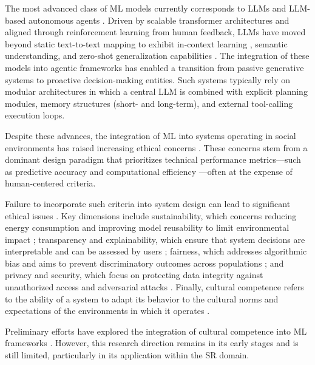 The most advanced class of ML models currently corresponds to LLMs \citep{raiaan2024review} and LLM-based autonomous agents \citep{luo2025large}. 
Driven by scalable transformer architectures and aligned through reinforcement learning from human feedback, LLMs have moved beyond static text-to-text mapping to exhibit in-context learning \citep{dong2024survey}, semantic understanding, and zero-shot generalization capabilities \citep{kojima2022large}. 
The integration of these models into agentic frameworks has enabled a transition from passive generative systems to proactive decision-making entities. 
Such systems typically rely on modular architectures in which a central LLM is combined with explicit planning modules, memory structures (short- and long-term), and external tool-calling execution loops.

Despite these advances, the integration of ML into systems operating in social environments has raised increasing ethical concerns \citep{weidinger2021ethical, MLEthicsLaw, PhenotypesML}. 
These concerns stem from a dominant design paradigm that prioritizes technical performance metrics—such as predictive accuracy and computational efficiency \citep{regressionMetrics, rlMetrics, rlMetrics2, semi-supervisedMetrics, multi-class-metrics, ComputationalMetrics}—often at the expense of human-centered criteria.

Failure to incorporate such criteria into system design can lead to significant ethical issues \citep{electronics10050593, Human_metrics, ECThicGuidelines}. 
Key dimensions include sustainability, which concerns reducing energy consumption and improving model reusability to limit environmental impact \citep{strubell_etal_2019_energy}; transparency and explainability, which ensure that system decisions are interpretable and can be assessed by users \citep{ExplainabilityRequirements, causabilityMedicine, guidotti2018survey, XMLMetrics}; fairness, which addresses algorithmic bias and aims to prevent discriminatory outcomes across populations \citep{fairness, Onetofairness, AccuracyvsFairness}; and privacy and security, which focus on protecting data integrity against unauthorized access and adversarial attacks \citep{liu2020machine, Biggio_2018, SecML}. 
Finally, cultural competence refers to the ability of a system to adapt its behavior to the cultural norms and expectations of the environments in which it operates \citep{survey_fairness_wreprbias}.

Preliminary efforts have explored the integration of cultural competence into ML frameworks \citep{dlHumorRecognition, miehle2021multimodal, almaliki2016persuasive, khan2021one, dmytryk2022mining, karpouzis2024plato, Wu2012TheAO, dwivedi2024navigating, cirucci2024culturally, Quan2018, Zhou2022445, yun2024cic, mohamed2022artelingo, alharbi2023cultural, alharbi2024deep, jordan2023impact, castilla2022applying, yohe2023towards, blanchard2024cultural, bhatia2023gd, albuquerque2024hype, kuo2024identification}. 
However, this research direction remains in its early stages and is still limited, particularly in its application within the SR domain.

